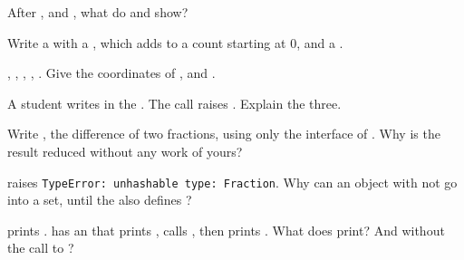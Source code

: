 \begin{exercise}[$\star$]\label{exo:g12:classes-and-objects:2}
After ,  and , what do
 and  show?
\end{exercise}

\begin{exercise}[$\star$]\label{exo:g12:classes-and-objects:3}
Write a   with a  , which adds  to a count starting at $0$, and a 
.
\end{exercise}

\begin{exercise}[$\star$]\label{exo:g12:classes-and-objects:4}
, , , , . Give the
coordinates of ,  and .
\end{exercise}

\begin{exercise}[$\star$]\label{exo:g12:classes-and-objects:5}
A student writes  in the  . The call  raises
. Explain the three.
\end{exercise}

\begin{exercise}[$\star\star$]\label{exo:g12:classes-and-objects:6}
Write , the difference of two fractions, using only the interface of . Why is the result
reduced without any work of yours?
\end{exercise}

\begin{exercise}[$\star\star$]\label{exo:g12:classes-and-objects:7}
 raises \texttt{TypeError: unhashable type: \textquotesingle{}Fraction\textquotesingle{}}. Why can an object with 
not go into a set, until the  also defines ?
\end{exercise}

\begin{exercise}[$\star\star$]\label{exo:g12:classes-and-objects:8}
 prints .  has an  that prints , calls
, then prints . What does  print? And without the call to
?
\end{exercise}

